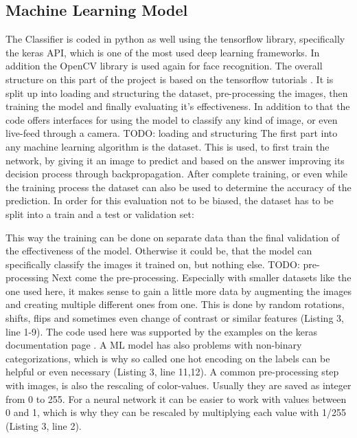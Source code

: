 \subsection{Machine Learning Model}

The Classifier is coded in python as well using the tensorflow library,
specifically the keras API, which is one of the most used deep learning
frameworks. In addition the OpenCV library is used again for face recognition. 
\newline
The overall structure on this part of the project is based on the tensorflow
tutorials \cite{tut}. It is split up into loading and structuring the dataset,
pre-processing the images, then training the model and finally evaluating it's
effectiveness. In addition to that the code offers interfaces for using the
model to classify any kind of image, or even live-feed through a camera.
\newline
TODO: loading and structuring
The first part into any machine learning algorithm is the dataset. This is used,
to first train the network, by giving it an image to predict and based on the
answer improving its decision process through backpropagation. After complete
training, or even while the training process the dataset can also be used to
determine the accuracy of the prediction. In order for this evaluation not to be
biased, the dataset has to be split into a train and a test or validation set:

This way the training can be done on separate data than the final validation of
the effectiveness of the model. Otherwise it could be, that the model can
specifically classify the images it trained on, but nothing else.
\newline
TODO: pre-processing
Next come the pre-processing. Especially with smaller datasets like the one used
here, it makes sense to gain a little more data by augmenting the images and
creating multiple different ones from one. This is done by random rotations,
shifts, flips and sometimes even change of contrast or similar features (Listing
3, line 1-9). The code used here was supported by the examples on the keras
documentation page \cite{zoom_range=0.2}.
\newline
A ML model has also problems with non-binary categorizations, which is why so
called one hot encoding on the labels can be helpful or even necessary (Listing
3, line 11,12). 
\newline
A common pre-processing step with images, is also the rescaling of color-values.
Usually they are saved as integer from 0 to 255. For a neural network it can be
easier to work with values between 0 and 1, which is why they can be rescaled by
multiplying each value with 1/255 (Listing 3, line 2).

